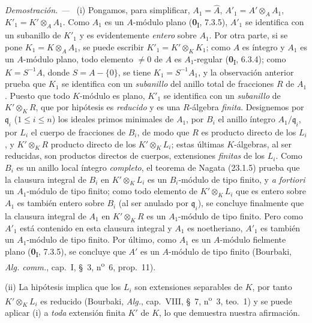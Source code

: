 \documentclass[10pt,oneside]{book}
\newcommand{\oldpage}[2][]{%
  \setcounter{footnote}{0}%
  \marginpar{\scriptsize\textbf{#1}~|~#2}\ignorespaces}
\newenvironment{proof}{%
  \par\medskip\noindent\textit{Demostración. ---\ }}{\par}
\providecommand{\setmin}{-}%
\begin{document}
\begin{proof}
(i) Pongamos, para simplificar, $A_1=\widehat A$,
$A'_1=A'\otimes_AA_1$, $K'_1=K'\otimes_AA_1$. Como $A_1$ es un
$A$-módulo plano (\textbf{0}\textsubscript{I}, 7.3.5), $A'_1$ se identifica con un
subanillo de $K'_1$ y es evidentemente \emph{entero} sobre $A_1$. Por otra parte, si
se pone $K_1=K\otimes_AA_1$, se puede escribir
$K'_1=K'\otimes_KK_1$; como $A$ es íntegro y $A_1$ es un $A$-módulo
plano, todo elemento $\neq0$ de $A$ es $A_1$-regular
(\textbf{0}\textsubscript{I}, 6.3.4); como $K=S^{-1}A$, donde $S=A\setmin\{0\}$, se tiene
$K_1=S^{-1}A_1$, y la observación anterior prueba que $K_1$ se identifica con un
\emph{subanillo} del anillo total de fracciones $R$ de $A_1$. Puesto que todo
$K$-módulo es plano, $K'_1$ se identifica con un \emph{subanillo} de $K'\otimes_KR$,
que por hipótesis es \emph{reducido} y es una $R$-álgebra \emph{finita}. Designemos por
$\mathfrak q_i$ ($1\leqslant i\leqslant n$) los ideales primos minimales de
$A_1$, por $B_i$ el anillo íntegro $A_1/\mathfrak q_i$, por $L_i$ el cuerpo de
fracciones de $B_i$, de modo que $R$ es producto directo de los $L_i$, y
$K'\otimes_KR$ producto directo de los $K'\otimes_KL_i$; estas últimas
$K$-álgebras, al ser reducidas, son productos directos de cuerpos,
extensiones \emph{finitas} de los $L_i$. Como $B_i$ es un anillo local íntegro
\emph{completo}, el teorema de Nagata (23.1.5) prueba que la clausura
integral de $B_i$ en $K'\otimes_KL_i$ es un $B_i$-módulo de tipo finito, y
\emph{a fortiori} un $A_1$-módulo de tipo finito; como todo elemento de
$K'\otimes_KL_i$ que es entero sobre $A_1$ es también entero sobre $B_i$ (al ser
anulado por $\mathfrak q_i$), se concluye finalmente que la clausura
integral de $A_1$ en $K'\otimes_KR$ es un $A_1$-módulo de tipo finito. Pero
como $A'_1$ está contenido en esta clausura integral y $A_1$ es
noetheriano, $A'_1$ es también un $A_1$-módulo de tipo finito. Por último, como $A_1$
es un $A$-módulo fielmente plano (\textbf{0}\textsubscript{I}, 7.3.5), se concluye
que $A'$ es un $A$-módulo de tipo finito (Bourbaki, \emph{Alg. comm.},
cap.~I, §~3, n\textsuperscript{o}~6, prop.~11).

\oldpage[0\textsubscript{IV-1}]{217}

(ii) La hipótesis implica que los $L_i$ son extensiones separables
de $K$, por tanto $K'\otimes_KL_i$ es reducido (Bourbaki, \emph{Alg.}, cap.~VIII,
§~7, n\textsuperscript{o}~3, teo.~1) y se puede aplicar (i) a \emph{toda}
extensión finita $K'$ de $K$, lo que demuestra nuestra afirmación.
\end{proof}
\end{document}
